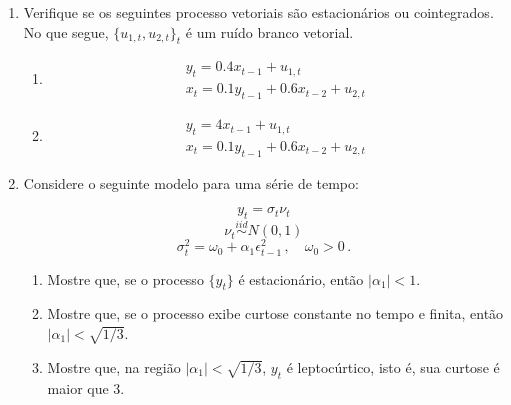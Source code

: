 \documentclass[10pt,a4paper]{article}
\begin{document}
	\begin{enumerate}
		\item Verifique se os seguintes processo vetoriais são estacionários ou cointegrados. No que segue, $\{u_{1,t},u_{2,t}\}_t$ é um ruído branco vetorial.
		
		\begin{enumerate}
			\item 		
			\begin{equation}
				\begin{aligned}
								y_t = 0.4 x_{t-1} + u_{1,t}\\
					x_t = 0.1 y_{t-1} + 0.6 x_{t-2} + u_{2,t}
					\end{aligned}
		\end{equation}
		\item 	\begin{equation}
			\begin{aligned}
				y_t = 4 x_{t-1} + u_{1,t}\\
				x_t = 0.1 y_{t-1} + 0.6 x_{t-2} + u_{2,t}
			\end{aligned}
		\end{equation}
	\end{enumerate}
	
	\item Considere o seguinte modelo para uma série de tempo:
	
	$$y_t = \sigma_t \nu_t$$
	$$\nu_t \overset{iid}{\sim}N(0,1)$$
	$$\sigma_t^2 = \omega_0 + \alpha_1 \epsilon_{t-1}^2\, , \quad \omega_0 > 0\, .$$
	
\begin{enumerate}
	\item Mostre que, se o processo $\{y_t\}$ é estacionário, então $|\alpha_1| < 1$.
	\item Mostre que, se o processo exibe curtose constante no tempo e finita, então $|\alpha_1| < \sqrt{1/3}$.
	\item Mostre que, na região   $|\alpha_1| < \sqrt{1/3}$, $y_t$ é leptocúrtico, isto é, sua curtose é maior que $3$.
\end{enumerate}
	\end{enumerate}
\end{document}
